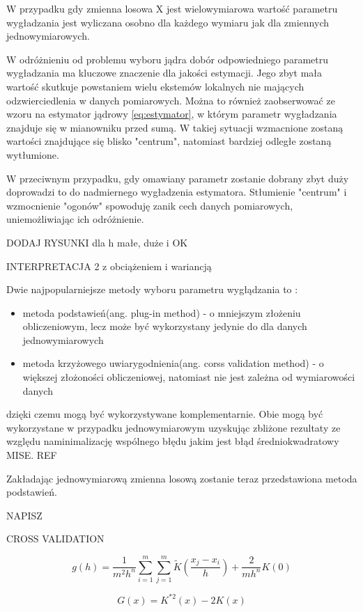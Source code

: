 W przypadku gdy zmienna losowa X jest wielowymiarowa wartość parametru wygładzania jest wyliczana osobno dla każdego wymiaru jak dla zmiennych jednowymiarowych. 

W odróżnieniu od problemu wyboru jądra dobór odpowiedniego parametru wygładzania ma kluczowe znaczenie dla jakości estymacji. Jego zbyt mała wartość skutkuje powstaniem wielu ekstemów lokalnych nie mających odzwierciedlenia w danych pomiarowych. Można to również zaobserwować ze wzoru na estymator jądrowy \ref{eq:estymator}, w którym parametr wygładzania znajduje się w mianowniku przed sumą. W takiej sytuacji wzmacnione zostaną wartości znajdujące się blisko "centrum", natomiast bardziej odległe zostaną wytłumione.

W przeciwnym przypadku, gdy omawiany parametr zostanie dobrany zbyt duży doprowadzi to do nadmiernego wygładzenia estymatora. Stłumienie "centrum" i wzmocnienie "ogonów" spowoduję zanik cech danych pomiarowych, uniemożliwiając ich odróżnienie.

DODAJ RYSUNKI dla h małe, duże i OK

INTERPRETACJA 2 z obciążeniem i wariancją

Dwie najpopularniejsze metody wyboru parametru wygłądzania to :
\begin{itemize}
\item metoda podstawień(ang. plug-in method) - o mniejszym złożeniu obliczeniowym, lecz może być wykorzystany jedynie do dla danych jednowymiarowych
\item metoda krzyżowego uwiarygodnienia(ang. corss validation method) - o większej złożoności obliczeniowej, natomiast nie jest zależna od wymiarowości danych
\end{itemize}
dzięki czemu mogą być wykorzystywane komplementarnie. Obie mogą być wykorzystane w przypadku jednowymiarowym uzyskując zbliżone rezultaty ze względu naminimalizację wspólnego błędu jakim jest błąd średniokwadratowy MISE. REF

Zakładając jednowymiarową zmienna losową zostanie teraz przedstawiona metoda podstawień.

NAPISZ

CROSS VALIDATION

\begin{equation}
g(h)=\frac{1}{m^2h^n}\displaystyle\sum_{i=1}^{m} \displaystyle\sum_{j=1}^{m} \widetilde{K}(\frac{x_j - x_i}{h}) + \frac{2}{mh^n}K(0)
\end{equation}

\begin{equation}
G(x) = K^{*2}(x) - 2K(x)
\end{equation}

